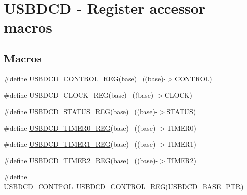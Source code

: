 \hypertarget{group___u_s_b_d_c_d___register___accessor___macros}{}\section{U\+S\+B\+D\+CD -\/ Register accessor macros}
\label{group___u_s_b_d_c_d___register___accessor___macros}
\subsection*{Macros}
\begin{DoxyCompactItemize}
\item 
\#define \hyperlink{group___u_s_b_d_c_d___register___accessor___macros_ga257d5151df6a12b6afd43a0ab18bd985}{U\+S\+B\+D\+C\+D\+\_\+\+C\+O\+N\+T\+R\+O\+L\+\_\+\+R\+EG}(base)                              ~((base)-\/$>$C\+O\+N\+T\+R\+OL)
\item 
\#define \hyperlink{group___u_s_b_d_c_d___register___accessor___macros_ga8bba9961332354ffeb00ecf680537695}{U\+S\+B\+D\+C\+D\+\_\+\+C\+L\+O\+C\+K\+\_\+\+R\+EG}(base)                                  ~((base)-\/$>$C\+L\+O\+CK)
\item 
\#define \hyperlink{group___u_s_b_d_c_d___register___accessor___macros_ga99a4ce6cc19f531916ab02aea07e14a9}{U\+S\+B\+D\+C\+D\+\_\+\+S\+T\+A\+T\+U\+S\+\_\+\+R\+EG}(base)                                ~((base)-\/$>$S\+T\+A\+T\+US)
\item 
\#define \hyperlink{group___u_s_b_d_c_d___register___accessor___macros_ga5eab5fbaf9280881c33dc0ed61dfbb80}{U\+S\+B\+D\+C\+D\+\_\+\+T\+I\+M\+E\+R0\+\_\+\+R\+EG}(base)                                ~((base)-\/$>$T\+I\+M\+E\+R0)
\item 
\#define \hyperlink{group___u_s_b_d_c_d___register___accessor___macros_ga88e54db7c70cc1d168f792ffd054ceea}{U\+S\+B\+D\+C\+D\+\_\+\+T\+I\+M\+E\+R1\+\_\+\+R\+EG}(base)                                ~((base)-\/$>$T\+I\+M\+E\+R1)
\item 
\#define \hyperlink{group___u_s_b_d_c_d___register___accessor___macros_ga0c14ac0966245ae63c84653a5c9ee453}{U\+S\+B\+D\+C\+D\+\_\+\+T\+I\+M\+E\+R2\+\_\+\+R\+EG}(base)                                ~((base)-\/$>$T\+I\+M\+E\+R2)
\item 
\#define \hyperlink{group___u_s_b_d_c_d___register___accessor___macros_ga70240dec5113361c1f15695ed389e323}{U\+S\+B\+D\+C\+D\+\_\+\+C\+O\+N\+T\+R\+OL}~\hyperlink{group___u_s_b_d_c_d___register___accessor___macros_ga257d5151df6a12b6afd43a0ab18bd985}{U\+S\+B\+D\+C\+D\+\_\+\+C\+O\+N\+T\+R\+O\+L\+\_\+\+R\+EG}(\hyperlink{group___u_s_b_d_c_d___peripheral_ga6289dc687e9b991508629237aeb61755}{U\+S\+B\+D\+C\+D\+\_\+\+B\+A\+S\+E\+\_\+\+P\+TR})

\end{DoxyCompactItemize}
